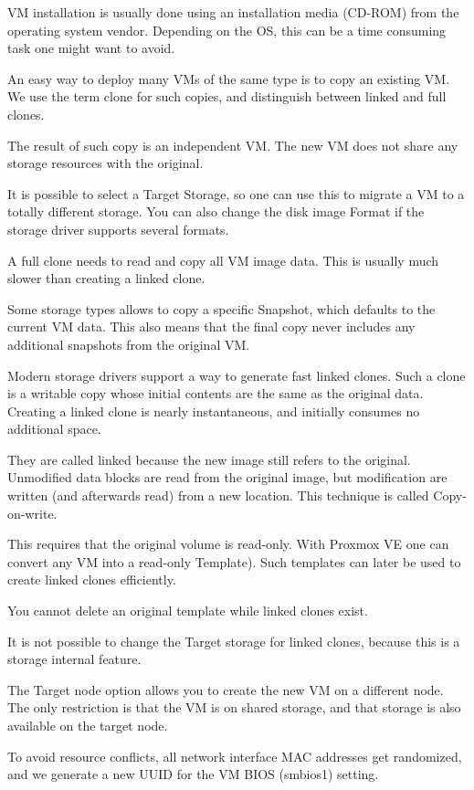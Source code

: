 VM installation is usually done using an installation media (CD-ROM) from the operating system vendor. Depending on the OS, this can be a time consuming task one might want to avoid.

An easy way to deploy many VMs of the same type is to copy an existing VM. We use the term clone for such copies, and distinguish between linked and full clones.

The result of such copy is an independent VM. The new VM does not share any storage resources with the original.

It is possible to select a Target Storage, so one can use this to migrate a VM to a totally different storage. You can also change the disk image Format if the storage driver supports several formats.

A full clone needs to read and copy all VM image data. This is usually much slower than creating a linked clone.

Some storage types allows to copy a specific Snapshot, which defaults to the current VM data. This also means that the final copy never includes any additional snapshots from the original VM.

Modern storage drivers support a way to generate fast linked clones. Such a clone is a writable copy whose initial contents are the same as the original data. Creating a linked clone is nearly instantaneous, and initially consumes no additional space.

They are called linked because the new image still refers to the original. Unmodified data blocks are read from the original image, but modification are written (and afterwards read) from a new location. This technique is called Copy-on-write.

This requires that the original volume is read-only. With Proxmox VE one can convert any VM into a read-only Template). Such templates can later be used to create linked clones efficiently.

You cannot delete an original template while linked clones exist.

It is not possible to change the Target storage for linked clones, because this is a storage internal feature.

The Target node option allows you to create the new VM on a different node. The only restriction is that the VM is on shared storage, and that storage is also available on the target node.

To avoid resource conflicts, all network interface MAC addresses get randomized, and we generate a new UUID for the VM BIOS (smbios1) setting.



